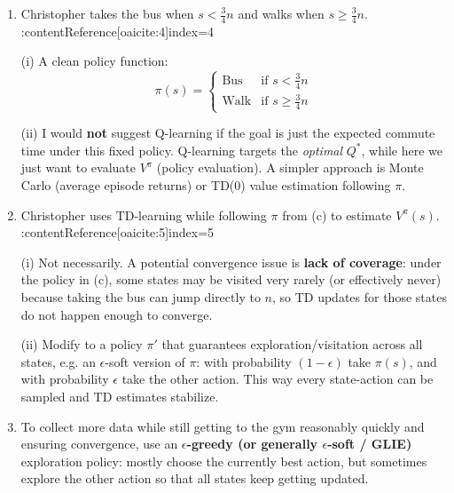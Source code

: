 \documentclass{article}
\begin{document}
\begin{enumerate}[label=(\alph*)]
\medskip
\noindent \textbf{Step 5: } $(4,\text{Walk},1,5)$
\[
\max_{a'}\hat Q(5,a')=0
\qquad\Rightarrow\qquad
\hat Q(4,\text{Walk}) = 0 + 0.5(1)=0.5.
\]

\medskip
\noindent \textbf{Final requested values (from the above pass):} \\
$\hat Q(1,\text{Bus})$ after step 1: $-0.5$ \\
$\hat Q(1,\text{Bus})$ after full pass: $1.125$ \\
$\hat Q(3,\text{Walk})$: $0.5$ \\
$\hat Q(4,\text{Walk})$: $0.5$


\item %
Christopher takes the bus when $s<\tfrac{3}{4}n$ and walks when $s\ge \tfrac{3}{4}n$. :contentReference[oaicite:4]{index=4}

\medskip
\noindent (i) A clean policy function:
\[
\pi(s)=
\begin{cases}
\text{Bus} & \text{if } s < \tfrac{3}{4}n\\
\text{Walk} & \text{if } s \ge \tfrac{3}{4}n
\end{cases}
\]

\medskip
\noindent (ii) I would \textbf{not} suggest Q-learning if the goal is just the expected commute time under this fixed policy.
Q-learning targets the \emph{optimal} $Q^*$, while here we just want to evaluate $V^\pi$ (policy evaluation).
A simpler approach is Monte Carlo (average episode returns) or TD(0) value estimation following $\pi$.

\item %
Christopher uses TD-learning while following $\pi$ from (c) to estimate $V^\pi(s)$. :contentReference[oaicite:5]{index=5}

\medskip
\noindent (i) Not necessarily. A potential convergence issue is \textbf{lack of coverage}: under the policy in (c),
some states may be visited very rarely (or effectively never) because taking the bus can jump directly to $n$,
so TD updates for those states do not happen enough to converge.

\medskip
\noindent (ii) Modify to a policy $\pi'$ that guarantees exploration/visitation across all states, e.g.
an $\epsilon$-soft version of $\pi$:
with probability $(1-\epsilon)$ take $\pi(s)$, and with probability $\epsilon$ take the other action.
This way every state-action can be sampled and TD estimates stabilize.

\item %
To collect more data while still getting to the gym reasonably quickly and ensuring convergence,
use an \textbf{$\epsilon$-greedy (or generally $\epsilon$-soft / GLIE)} exploration policy:
mostly choose the currently best action, but sometimes explore the other action so that all states keep getting updated.

\end{enumerate}
\end{document}
